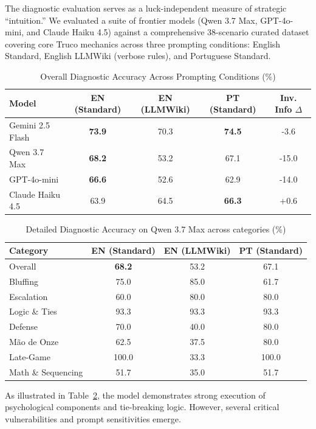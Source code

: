 \documentclass[11pt]{article}
\begin{document}
The diagnostic evaluation serves as a luck-independent measure of strategic ``intuition.'' We evaluated a suite of frontier models (Qwen 3.7 Max, GPT-4o-mini, and Claude Haiku 4.5) against a comprehensive 38-scenario curated dataset covering core Truco mechanics across three prompting conditions: English Standard, English LLMWiki (verbose rules), and Portuguese Standard.

\begin{table}[htbp]
\centering
\caption{Overall Diagnostic Accuracy Across Prompting Conditions (\%)}
\label{tab:multi_model}
\begin{tabular}{@{}lcccc@{}}
\toprule
Model & EN (Standard) & EN (LLMWiki) & PT (Standard) & Inv. Info $\Delta$ \\
\midrule
Gemini 2.5 Flash & \textbf{73.9} & 70.3 & \textbf{74.5} & -3.6 \\
Qwen 3.7 Max & \textbf{68.2} & 53.2 & 67.1 & -15.0 \\
GPT-4o-mini & \textbf{66.6} & 52.6 & 62.9 & -14.0 \\
Claude Haiku 4.5 & 63.9 & 64.5 & \textbf{66.3} & +0.6 \\
\bottomrule
\end{tabular}
\end{table}

\begin{table}[htbp]
\centering
\caption{Detailed Diagnostic Accuracy on Qwen 3.7 Max across categories (\%)}
\label{tab:diagnostics_v3}
\begin{tabular}{@{}lccc@{}}
\toprule
Category & EN (Standard) & EN (LLMWiki) & PT (Standard) \\
\midrule
Overall & \textbf{68.2} & 53.2 & 67.1 \\
\midrule
Bluffing & 75.0 & 85.0 & 61.7 \\
Escalation & 60.0 & 80.0 & 80.0 \\
Logic \& Ties & 93.3 & 93.3 & 93.3 \\
Defense & 70.0 & 40.0 & 80.0 \\
Mão de Onze & 62.5 & 37.5 & 80.0 \\
Late-Game & 100.0 & 33.3 & 100.0 \\
\midrule
Math \& Sequencing & 51.7 & 35.0 & 51.7 \\
\bottomrule
\end{tabular}
\end{table}

As illustrated in Table~\ref{tab:diagnostics_v3}, the model demonstrates strong execution of psychological components and tie-breaking logic. However, several critical vulnerabilities and prompt sensitivities emerge.
\end{document}
